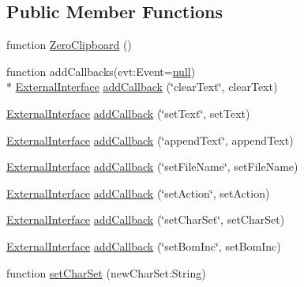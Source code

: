 \subsection*{Public Member Functions}
\begin{DoxyCompactItemize}
\item 
function \hyperlink{class_zero_clipboard_aad03b0fbbc590577440cd74299a0cab0}{Zero\+Clipboard} ()
\item 
function add\+Callbacks(evt\+:\+Event=\hyperlink{class_zero_clipboard_a07e1a60f83830226b8aac053dcef7b9c}{null}) \\*
\hyperlink{_zero_clipboard_pdf_8as_a8adbb9e92ce78f1cd583ebf4ff65e221}{External\+Interface} \hyperlink{class_zero_clipboard_af343712cdc0c26b2a44dbf6bf6ec0521}{add\+Callback} (\char`\"{}clear\+Text\char`\"{}, clear\+Text)
\item 
\hyperlink{_zero_clipboard_pdf_8as_a8adbb9e92ce78f1cd583ebf4ff65e221}{External\+Interface} \hyperlink{class_zero_clipboard_ae7b014d9d344b1d2d3e18e6ee4c9180d}{add\+Callback} (\char`\"{}set\+Text\char`\"{}, set\+Text)
\item 
\hyperlink{_zero_clipboard_pdf_8as_a8adbb9e92ce78f1cd583ebf4ff65e221}{External\+Interface} \hyperlink{class_zero_clipboard_a104132f591fb29c7078bb8e32613b237}{add\+Callback} (\char`\"{}append\+Text\char`\"{}, append\+Text)
\item 
\hyperlink{_zero_clipboard_pdf_8as_a8adbb9e92ce78f1cd583ebf4ff65e221}{External\+Interface} \hyperlink{class_zero_clipboard_a010becc475ac63e326b141261e9bfe93}{add\+Callback} (\char`\"{}set\+File\+Name\char`\"{}, set\+File\+Name)
\item 
\hyperlink{_zero_clipboard_pdf_8as_a8adbb9e92ce78f1cd583ebf4ff65e221}{External\+Interface} \hyperlink{class_zero_clipboard_a6dabca5a8d3ecb84361b8da8c6a48083}{add\+Callback} (\char`\"{}set\+Action\char`\"{}, set\+Action)
\item 
\hyperlink{_zero_clipboard_pdf_8as_a8adbb9e92ce78f1cd583ebf4ff65e221}{External\+Interface} \hyperlink{class_zero_clipboard_acf2cc4a8e5ffec84002ec21bc8c6e8a2}{add\+Callback} (\char`\"{}set\+Char\+Set\char`\"{}, set\+Char\+Set)
\item 
\hyperlink{_zero_clipboard_pdf_8as_a8adbb9e92ce78f1cd583ebf4ff65e221}{External\+Interface} \hyperlink{class_zero_clipboard_a35fad11a51480274821656e9aa99dffa}{add\+Callback} (\char`\"{}set\+Bom\+Inc\char`\"{}, set\+Bom\+Inc)
\item 
function \hyperlink{class_zero_clipboard_afff74945c875f8b8a2df04efa17d9a08}{set\+Char\+Set} (new\+Char\+Set\+:\+String)

\end{DoxyCompactItemize}
